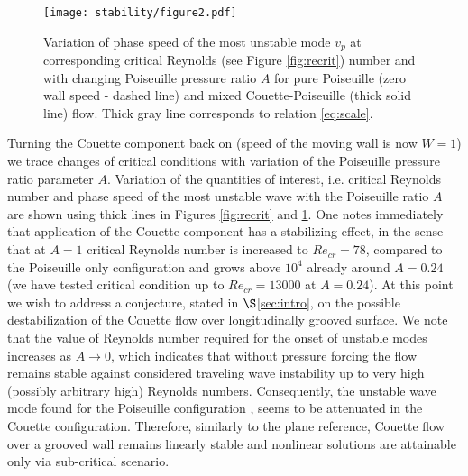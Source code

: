 \documentclass[lineno]{jfm}
\begin{document}
\begin{figure}
\centering
	\texttt{[image: stability/figure2.pdf]}  
	\caption{Variation of phase speed of the most unstable mode $v_{p}$ at corresponding critical Reynolds (see Figure \ref{fig:recrit}) number and with changing Poiseuille pressure ratio $A$ for pure Poiseuille (zero wall speed - dashed line) and mixed Couette-Poiseuille (thick solid line) flow. Thick gray line corresponds to  relation  \eqref{eq:scale}.}
	\label{fig:phasevel}
\end{figure}

Turning the Couette component back on (speed of the moving wall is now $W=1$) we trace changes of critical conditions with variation of the Poiseuille pressure ratio parameter $A$.
Variation of the quantities of interest, i.e. critical Reynolds number and phase speed of the most unstable wave with the Poiseuille ratio $A$ are shown using thick lines in Figures \ref{fig:recrit} and \ref{fig:phasevel}.
One notes immediately that application of the Couette component has a stabilizing effect, in the sense that at $A=1$ critical Reynolds number is increased to $Re_{cr}=78$, compared to the Poiseuille only configuration and grows above $10^4$ already around $A=0.24$ (we have tested critical condition up to $Re_{cr}=13000$ at $A=0.24$).
At this point we wish to address a conjecture, stated in $\S$\ref{sec:intro}, on the possible destabilization of the Couette flow over longitudinally grooved surface.
We note that the value of Reynolds number required for the onset of unstable modes increases as $A\to0$, which indicates that without pressure forcing the flow remains stable against considered traveling wave instability up to very high (possibly arbitrary high) Reynolds numbers.
Consequently, the unstable wave mode found for the Poiseuille configuration \citep{Nikesh2017}, seems to be attenuated in the Couette configuration.
Therefore, similarly to the plane reference, Couette flow over a grooved wall remains linearly stable and nonlinear solutions are attainable only via sub-critical scenario.
\end{document}
